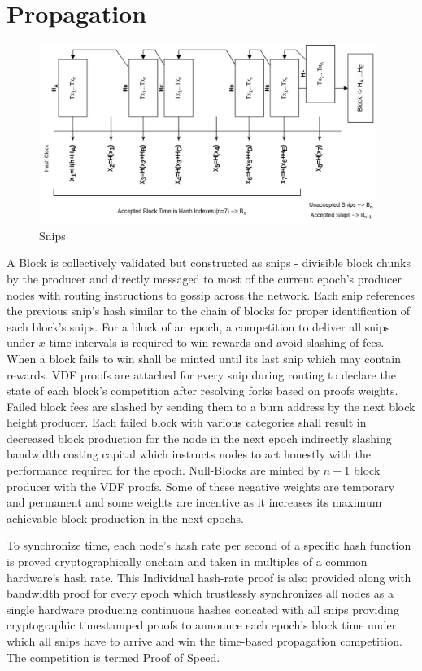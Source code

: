 \documentclass[a4paper,10pt]{article}
\begin{document}
\section{Propagation}
\begin{figure}[H]
\begin{center}
\includegraphics[width=11cm]{Snips}
\caption{Snips}
\end{center}
\end{figure}
A Block is collectively validated but constructed as snips - divisible block chunks by the producer and directly messaged to most of the current epoch's producer nodes with routing instructions to gossip across the network. Each snip references the previous snip's hash similar to the chain of blocks for proper identification of each block's snips. For a block of an epoch, a competition to deliver all snips under $x$ time intervals is required to win rewards and avoid slashing of fees. When a block fails to win shall be minted until its last snip which may contain rewards. VDF proofs are attached for every snip during routing to declare the state of each block's competition after resolving forks based on proofs weights. Failed block fees are slashed by sending them to a burn address by the next block height producer. Each failed block with various categories shall result in decreased block production for the node in the next epoch indirectly slashing bandwidth costing capital which instructs nodes to act honestly with the performance required for the epoch. Null-Blocks are minted by $n-1$ block producer with the VDF proofs. Some of these negative weights are temporary and permanent and some weights are incentive as it increases its maximum achievable block production in the next epochs. 

To synchronize time, each node's hash rate per second of a specific hash function is proved cryptographically onchain and taken in multiples of a common hardware's hash rate. This Individual hash-rate proof is also provided along with bandwidth proof for every epoch which trustlessly synchronizes all nodes as a single hardware producing continuous hashes concated with all snips providing cryptographic timestamped proofs to announce each epoch's block time under which all snips have to arrive and win the time-based propagation competition. The competition is termed Proof of Speed.
\end{document}

